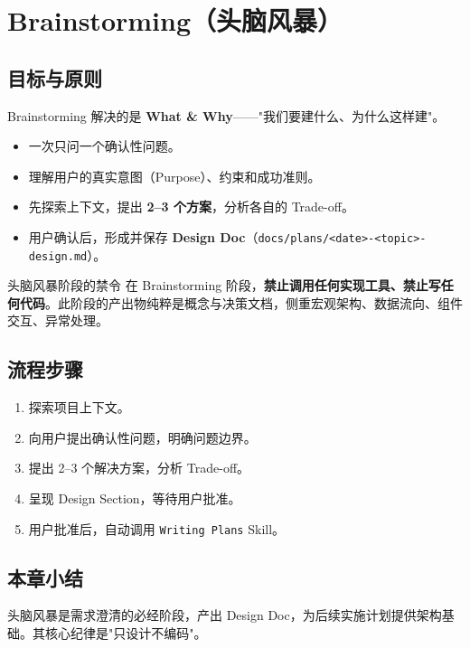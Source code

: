 \section{Brainstorming（头脑风暴）}

\subsection{目标与原则}

Brainstorming 解决的是 \textbf{What \& Why}——"我们要建什么、为什么这样建"。

\begin{itemize}
    \item 一次只问一个确认性问题。
    \item 理解用户的真实意图（Purpose）、约束和成功准则。
    \item 先探索上下文，提出 \textbf{2--3 个方案}，分析各自的 Trade-off。
    \item 用户确认后，形成并保存 \textbf{Design Doc}（\texttt{docs/plans/<date>-<topic>-design.md}）。
\end{itemize}

\begin{warningbox}{头脑风暴阶段的禁令}
在 Brainstorming 阶段，\textbf{禁止调用任何实现工具、禁止写任何代码}。此阶段的产出物纯粹是概念与决策文档，侧重宏观架构、数据流向、组件交互、异常处理。
\end{warningbox}

\subsection{流程步骤}

\begin{enumerate}
    \item 探索项目上下文。
    \item 向用户提出确认性问题，明确问题边界。
    \item 提出 2--3 个解决方案，分析 Trade-off。
    \item 呈现 Design Section，等待用户批准。
    \item 用户批准后，自动调用 \texttt{Writing Plans} Skill。
\end{enumerate}

\subsection{本章小结}

头脑风暴是需求澄清的必经阶段，产出 Design Doc，为后续实施计划提供架构基础。其核心纪律是"只设计不编码"。


